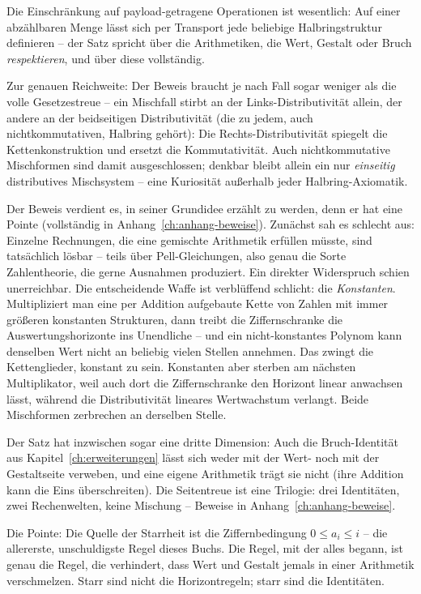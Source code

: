 Die Einschränkung auf payload-getragene Operationen ist wesentlich:
Auf einer abzählbaren Menge lässt sich per Transport jede beliebige
Halbringstruktur definieren -- der Satz spricht über die
Arithmetiken, die Wert, Gestalt oder Bruch \emph{respektieren},
und über diese vollständig.

Zur genauen Reichweite: Der Beweis braucht je nach Fall sogar
weniger als die volle Gesetzestreue -- ein Mischfall stirbt an der
Links-Distributivität allein, der andere an der beidseitigen
Distributivität (die zu jedem, auch nichtkommutativen, Halbring
gehört): Die Rechts-Distributivität spiegelt die Kettenkonstruktion
und ersetzt die Kommutativität. Auch nichtkommutative Mischformen
sind damit ausgeschlossen; denkbar bleibt allein ein nur
\emph{einseitig} distributives Mischsystem -- eine Kuriosität
außerhalb jeder Halbring-Axiomatik.

Der Beweis verdient es, in seiner Grundidee erzählt zu werden, denn
er hat eine Pointe (vollständig in Anhang~\ref{ch:anhang-beweise}). Zunächst sah es schlecht aus: Einzelne
Rechnungen, die eine gemischte Arithmetik erfüllen müsste, sind
tatsächlich lösbar -- teils über Pell-Gleichungen, also genau die
Sorte Zahlentheorie, die gerne Ausnahmen produziert. Ein direkter
Widerspruch schien unerreichbar. Die entscheidende Waffe ist
verblüffend schlicht: die \emph{Konstanten}. Multipliziert man eine
per Addition aufgebaute Kette von Zahlen mit immer größeren
konstanten Strukturen, dann treibt die Ziffernschranke die
Auswertungshorizonte ins Unendliche -- und ein nicht-konstantes
Polynom kann denselben Wert nicht an beliebig vielen Stellen
annehmen. Das zwingt die Kettenglieder, konstant zu sein. Konstanten
aber sterben am nächsten Multiplikator, weil auch dort die
Ziffernschranke den Horizont linear anwachsen lässt, während die
Distributivität lineares Wertwachstum verlangt. Beide Mischformen
zerbrechen an derselben Stelle.

Der Satz hat inzwischen sogar eine dritte Dimension: Auch die
Bruch-Identität aus Kapitel~\ref{ch:erweiterungen} lässt sich weder
mit der Wert- noch mit der Gestaltseite verweben, und eine eigene
Arithmetik trägt sie nicht (ihre Addition kann die Eins
überschreiten). Die Seitentreue ist eine Trilogie: drei Identitäten,
zwei Rechenwelten, keine Mischung -- Beweise in
Anhang~\ref{ch:anhang-beweise}.

Die Pointe: Die Quelle der Starrheit ist die Ziffernbedingung
$0\le a_i\le i$ -- die allererste, unschuldigste Regel dieses Buchs.
Die Regel, mit der alles begann, ist genau die Regel, die verhindert,
dass Wert und Gestalt jemals in einer Arithmetik verschmelzen. Starr
sind nicht die Horizontregeln; starr sind die Identitäten.

